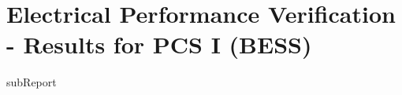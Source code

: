 \renewcommand{\DTRPcs}{IPPM} %
\renewcommand{\DTRPcsLong}{I (BESS)}


    \section{Electrical Performance Verification - Results for PCS \DTRPcsLong}

    {{subReport}}
    \newpage

